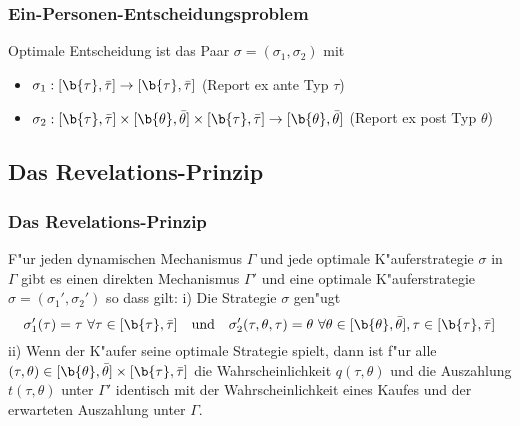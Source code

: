 \begin{frame}
  \frametitle{Ein-Personen-Entscheidungsproblem}
  \justifying
  \justifying
  Optimale Entscheidung ist das Paar $\sigma = (\sigma_{1}, \sigma_{2})$ mit
  \begin{itemize}
    \item $\sigma_{1}: [ \b{\tau} , \bar{\tau} ] \rightarrow [ \b{\tau} , \bar{\tau} ]$ (Report ex ante Typ $\tau$)
    \item $\sigma_{2}: [ \b{\tau} , \bar{\tau} ] \times [ \b{\theta} , \bar{\theta} ]
    \times [ \b{\tau} , \bar{\tau} ]  \rightarrow [ \b{\theta} , \bar{\theta} ]$ (Report ex post Typ $\theta$)
  \end{itemize}
\end{frame}

\subsection{Das Revelations-Prinzip}
\begin{frame}
  \frametitle{Das Revelations-Prinzip}
  \justifying
  \begin{thmP}
    F"ur jeden dynamischen Mechanismus $\Gamma$ und jede optimale K"auferstrategie $\sigma$ in $\Gamma$ gibt es
    einen direkten Mechanismus $\Gamma'$ und eine optimale K"auferstrategie $\sigma =(\sigma_{1}', \sigma_{2}')$
    so dass gilt: \newline \newline
    i) Die Strategie $\sigma$ gen"ugt
    \begin{equation*}
      \sigma_{1}' (\tau) = \tau \ \forall  \tau \in [\b{\tau} , \bar{\tau} ]
      \quad \text{und} \quad
      \sigma_{2}' (\tau, \theta, \tau) = \theta \ \forall  \theta \in [\b{\theta} , \bar{\theta} ], \tau \in [\b{\tau} , \bar{\tau} ]
    \end{equation*}
    ii) Wenn der K"aufer seine optimale Strategie spielt, dann ist f"ur alle
    $(\tau, \theta) \in [\b{\theta} , \bar{\theta} ] \times [\b{\tau} , \bar{\tau} ]$ die
    Wahrscheinlichkeit $q( \tau, \theta)$ und die Auszahlung $t(\tau, \theta)$ unter $\Gamma'$ identisch mit der
    Wahrscheinlichkeit eines Kaufes und der erwarteten Auszahlung unter $\Gamma$.
  \end{thmP}
\end{frame}

